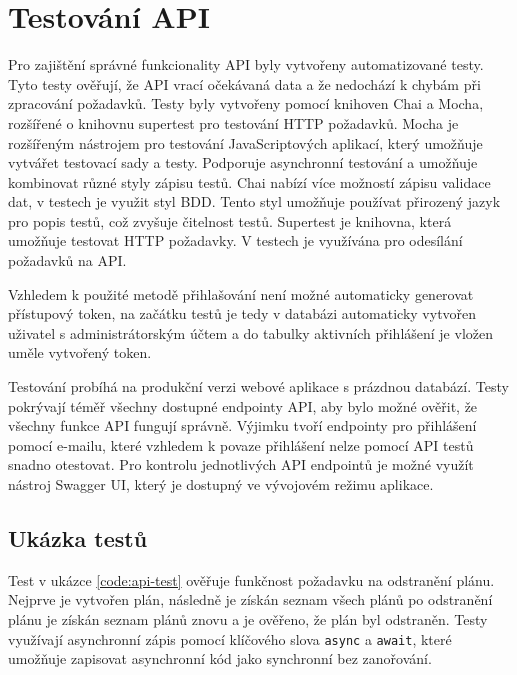 \section{Testování API}

Pro zajištění správné funkcionality API byly vytvořeny automatizované testy. Tyto testy ověřují, že API vrací očekávaná data a že nedochází k chybám při zpracování požadavků.
Testy byly vytvořeny pomocí knihoven Chai a Mocha, rozšířené o knihovnu supertest pro testování HTTP požadavků.
Mocha je rozšířeným nástrojem pro testování JavaScriptových aplikací, který umožňuje vytvářet testovací sady a testy. Podporuje asynchronní testování a umožňuje
kombinovat různé styly zápisu testů. Chai nabízí více možností zápisu validace dat, v testech je využit styl BDD. Tento styl umožňuje používat přirozený jazyk
pro popis testů, což zvyšuje čitelnost testů. Supertest je knihovna, která umožňuje testovat HTTP požadavky. V testech je využívána pro odesílání požadavků na API.

Vzhledem k použité metodě přihlašování není možné automaticky generovat přístupový token, na začátku testů je tedy v databázi automaticky
vytvořen uživatel s administrátorským účtem a do tabulky aktivních přihlášení je vložen uměle vytvořený token. 

Testování probíhá na produkční verzi webové aplikace s prázdnou databází. Testy pokrývají téměř všechny dostupné endpointy API, aby bylo možné
ověřit, že všechny funkce API fungují správně. Výjimku tvoří endpointy pro přihlášení pomocí e-mailu, které vzhledem k povaze přihlášení nelze 
pomocí API testů snadno otestovat. Pro kontrolu jednotlivých API endpointů je možné využít nástroj Swagger UI, který je dostupný ve vývojovém režimu aplikace.

\subsection{Ukázka testů}

Test v ukázce \ref{code:api-test} ověřuje funkčnost požadavku na odstranění plánu.
Nejprve je vytvořen plán, následně je získán seznam všech plánů po odstranění plánu je získán seznam plánů znovu a je ověřeno, že plán byl odstraněn.
Testy využívají asynchronní zápis pomocí klíčového slova \texttt{async} a \texttt{await}, které umožňuje zapisovat asynchronní kód jako synchronní bez zanořování.


